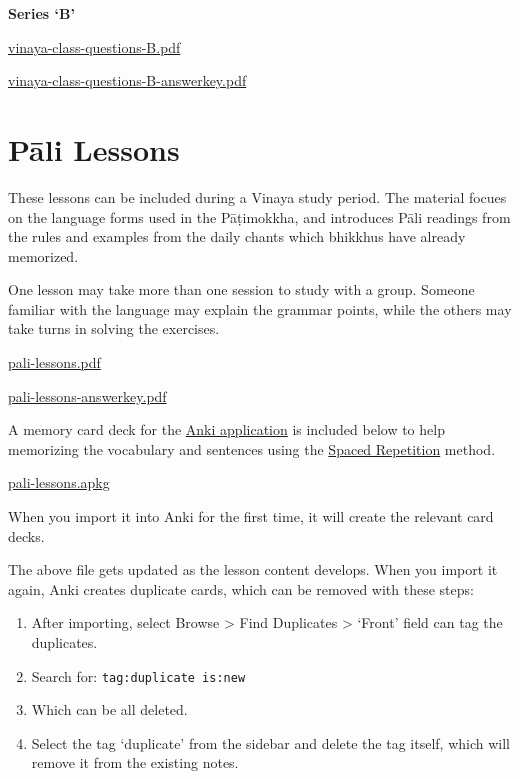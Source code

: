\textbf{Series `B'}

\href{./includes/docs/vinaya-class-questions-B.pdf}{vinaya-class-questions-B.pdf}

\href{./includes/docs/vinaya-class-questions-B-answerkey.pdf}{vinaya-class-questions-B-answerkey.pdf}

\section{Pāli Lessons}

These lessons can be included during a Vinaya study period. The material
focues on the language forms used in the Pāṭimokkha, and introduces Pāli
readings from the rules and examples from the daily chants which
bhikkhus have already memorized.

One lesson may take more than one session to study with a group. Someone
familiar with the language may explain the grammar points, while the
others may take turns in solving the exercises.

\href{./includes/docs/pali-lessons.pdf}{pali-lessons.pdf}

\href{./includes/docs/pali-lessons-answerkey.pdf}{pali-lessons-answerkey.pdf}

A memory card deck for the \href{https://apps.ankiweb.net/}{Anki
application} is included below to help memorizing the vocabulary and
sentences using the \href{https://gwern.net/spaced-repetition}{Spaced
Repetition} method.

\href{./includes/docs/pali-lessons.apkg}{pali-lessons.apkg}

When you import it into Anki for the first time, it will create the
relevant card decks.

The above file gets updated as the lesson content develops. When you
import it again, Anki creates duplicate cards, which can be removed with
these steps:

\begin{enumerate}
\def\labelenumi{\arabic{enumi}.}
\tightlist
\item
  After importing, select Browse \textgreater{} Find Duplicates
  \textgreater{} `Front' field can tag the duplicates.
\item
  Search for: \texttt{tag:duplicate\ is:new}
\item
  Which can be all deleted.
\item
  Select the tag `duplicate' from the sidebar and delete the tag itself,
  which will remove it from the existing notes.
\end{enumerate}

